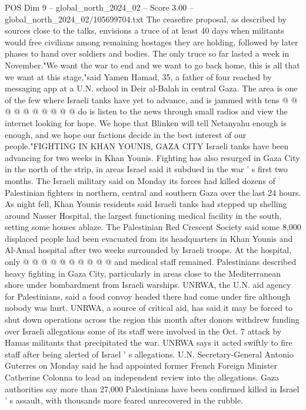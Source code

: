 \begin{textsample}{POS Dim 9 – global\_north\_2024\_02 – Score 3.00 – global\_north\_2024\_02/105699704.txt}
The ceasefire proposal, as described by sources close to the talks, envisions a truce of at least 40 days when militants would free civilians among remaining hostages they are holding, followed by later phases to hand over soldiers and bodies.
The only truce so far lasted a week in November."We want the war to end and we want to go back home, this is all that we want at this stage,"said Yamen Hamad, 35, a father of four reached by messaging app at a U.N. school in Deir al-Balah in central Gaza.
The area is one of the few where Israeli tanks have yet to advance, and is jammed with tens @ @ @ @ @ @ @ @ @ @ do is listen to the news through small radios and view the internet looking for hope.
We hope that Blinken will tell Netanyahu enough is enough, and we hope our factions decide in the best interest of our people."FIGHTING IN KHAN YOUNIS, GAZA CITY Israeli tanks have been advancing for two weeks in Khan Younis.
Fighting has also resurged in Gaza City in the north of the strip, in areas Israel said it subdued in the war ' s first two months.
The Israeli military said on Monday its forces had killed dozens of Palestinian fighters in northern, central and southern Gaza over the last 24 hours.
As night fell, Khan Younis residents said Israeli tanks had stepped up shelling around Nasser Hospital, the largest functioning medical facility in the south, setting some houses ablaze.
The Palestinian Red Crescent Society said some 8,000 displaced people had been evacuated from its headquarters in Khan Younis and Al-Amal hospital after two weeks surrounded by Israeli troops.
At the hospital, only @ @ @ @ @ @ @ @ @ @ and medical staff remained.
Palestinians described heavy fighting in Gaza City, particularly in areas close to the Mediterranean shore under bombardment from Israeli warships.
UNRWA, the U.N. aid agency for Palestinians, said a food convoy headed there had come under fire although nobody was hurt.
UNRWA, a source of critical aid, has said it may be forced to shut down operations across the region this month after donors withdrew funding over Israeli allegations some of its staff were involved in the Oct. 7 attack by Hamas militants that precipitated the war.
UNRWA says it acted swiftly to fire staff after being alerted of Israel ' s allegations.
U.N.
Secretary-General Antonio Guterres on Monday said he had appointed former French Foreign Minister Catherine Colonna to lead an independent review into the allegations.
Gaza authorities say more than 27,000 Palestinians have been confirmed killed in Israel ' s assault, with thousands more feared unrecovered in the rubble.

\end{textsample}
